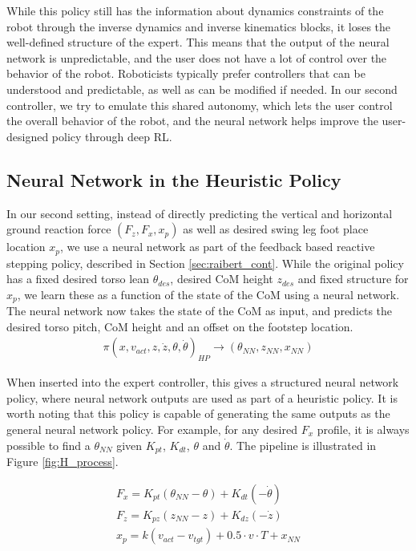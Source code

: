 While this policy still has the information about dynamics constraints of the robot through the inverse dynamics and inverse kinematics blocks, it loses the well-defined structure of the expert. This means that the output of the neural network is unpredictable, and the user does not have a lot of control over the behavior of the robot. Roboticists typically prefer controllers that can be understood and predictable, as well as can be modified if needed. In our second controller, we try to emulate this shared autonomy, which lets the user control the overall behavior of the robot, and the neural network helps improve the user-designed policy through deep RL.

\subsection{Neural Network in the Heuristic Policy}\label{NN_HP}

In our second setting, instead of directly predicting the vertical and horizontal ground reaction force $ (F_z, F_x,x_p)$ as well as desired swing leg foot place location $x_p$, we use a neural network as part of the feedback based reactive stepping policy, described in Section \ref{sec:raibert_cont}. 
While the original policy has a fixed desired torso lean $\theta_{des}$, desired CoM height $z_{des}$ and fixed structure for $x_p$, we learn these as a function of the state of the CoM using a neural network. The neural network now takes the state of the CoM as input, and predicts the desired torso pitch, CoM height and an offset on the footstep location.
\begin{align}
  \pi(x,v_{act},z,\dot{z},\theta,\dot{\theta})_{HP} \rightarrow  (\theta_{NN}, z_{NN},x_{NN}) 
\end{align}

When inserted into the expert controller, this gives a structured neural network policy, where neural network outputs are used as part of a heuristic policy. It is worth noting that this policy is capable of generating the same outputs as the general neural network policy. For example, for any desired $F_{x}$ profile, it is always possible to find a $\theta_{NN}$ given $K_{pt}$, $K_{dt}$, $\theta$ and $\dot{\theta}$. The pipeline is illustrated in Figure \ref{fig:H_process}.

\begin{align}
F_x = K_{pt}(\theta_{NN} - \theta) + K_{dt}(-\dot{\theta}) \\
F_z = K_{pz}(z_{NN}-z) + K_{dz}( - \dot{z}) \\
x_p=k(v_{act}-v_{tgt}) + 0.5 \cdot v \cdot T + x_{NN}\label{x_p eq}
\end{align}


